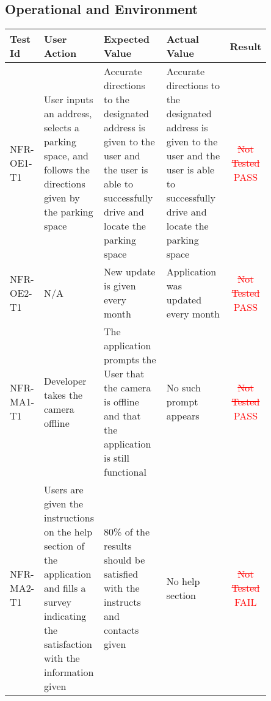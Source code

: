 \documentclass[12pt, titlepage]{article}
\begin{document}
\subsection{Operational and Environment}
\begin{center}
\begin{tabular}{|p{0.10\linewidth}|p{0.15\linewidth}|p{0.30\linewidth}|p{0.30\linewidth}|c|} 
\hline
\textbf{Test Id} & \textbf{User Action} & \textbf{Expected Value} &
\textbf{Actual Value} & \textbf{Result} \\
\hline 
NFR-OE1-T1 & User inputs an address, selects a parking space, and follows the
directions given by the parking space & Accurate directions to the designated
address is given to the user and the user is able to successfully drive and
locate the parking space & Accurate directions to the designated address is
given to the user and the user is able to successfully drive and locate the
parking space & \textcolor{red}{\st{Not Tested} PASS} \\
\hline 
NFR-OE2-T1 & N/A & New update is given every month & Application was updated
every month & \textcolor{red}{\st{Not Tested} PASS} \\
\hline 
NFR-MA1-T1 & Developer takes the camera offline & The application prompts the
User that the camera is offline and that the application is still functional &
No such prompt appears & \textcolor{red}{\st{Not Tested} PASS}\\
\hline 
NFR-MA2-T1 & Users are given the instructions on the help section of the
application and fills a survey indicating the satisfaction with the information
given & 80\% of the results should be satisfied with the instructs and contacts
given & No help section & \textcolor{red}{\st{Not Tested} FAIL} \\
\hline 
\end{tabular}
\end{center}
\end{document}
